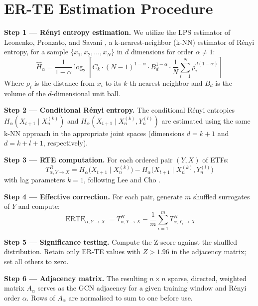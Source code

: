 \documentclass[12pt,oneside]{report}
\DeclareMathOperator{\ERTE}{ERTE}
\begin{document}
\section{ER-TE Estimation Procedure}\label{sec:erte}

\textbf{Step 1 --- Rényi entropy estimation.} We utilize the LPS
estimator of Leonenko, Pronzato, and Savani \cite{leonenko2008}, a
k-nearest-neighbor (k-NN) estimator of Rényi entropy, for a sample
$\{x_{1}, x_{2}, \ldots, x_{N}\}$ in $d$ dimensions for order
$\alpha \neq 1$:
\[
  \widehat{H}_{\alpha}
    = \frac{1}{1-\alpha}\log_{2}\left[
        C_{k} \cdot (N-1)^{1-\alpha} \cdot B_{d}^{1-\alpha}
        \cdot \frac{1}{N}\sum_{i=1}^{N}\rho_{i}^{d(1-\alpha)}
      \right]
\]
Where $\rho_{i}$ is the distance from $x_{i}$ to its $k$-th nearest
neighbor and $B_{d}$ is the volume of the $d$-dimensional unit ball.

\textbf{Step 2 --- Conditional Rényi entropy.} The conditional Rényi
entropies $H_{\alpha}(X_{t+1} \mid X_{n}^{(k)})$ and
$H_{\alpha}(X_{t+1} \mid X_{n}^{(k)}, Y_{n}^{(l)})$ are estimated using
the same k-NN approach in the appropriate joint spaces (dimensions
$d = k + 1$ and $d = k + l + 1$, respectively).

\textbf{Step 3 --- RTE computation.} For each ordered pair $(Y, X)$ of
ETFs:
\[
  T_{\alpha, Y \rightarrow X}^{R}
    = H_{\alpha}\bigl(X_{t+1} \mid X_{n}^{(k)}\bigr)
    - H_{\alpha}\bigl(X_{t+1} \mid X_{n}^{(k)}, Y_{n}^{(l)}\bigr)
\]
with lag parameters $k = 1$, following Lee and Cho \cite{lee2025}.

\textbf{Step 4 --- Effective correction.} For each pair, generate $m$
shuffled surrogates of $Y$ and compute:
\[
  \ERTE_{\alpha, Y \rightarrow X}
    = T_{\alpha, Y \rightarrow X}^{R}
    - \frac{1}{m}\sum_{i=1}^{m} T_{\alpha, Y_{i} \rightarrow X}^{R}
\]

\textbf{Step 5 --- Significance testing.} Compute the Z-score against
the shuffled distribution. Retain only ER-TE values with $Z > 1.96$ in
the adjacency matrix; set all others to zero.

\textbf{Step 6 --- Adjacency matrix.} The resulting $n \times n$ sparse,
directed, weighted matrix $A_{\alpha}$ serves as the GCN adjacency for a
given training window and Rényi order $\alpha$. Rows of $A_{\alpha}$ are
normalised to sum to one before use.
\end{document}
